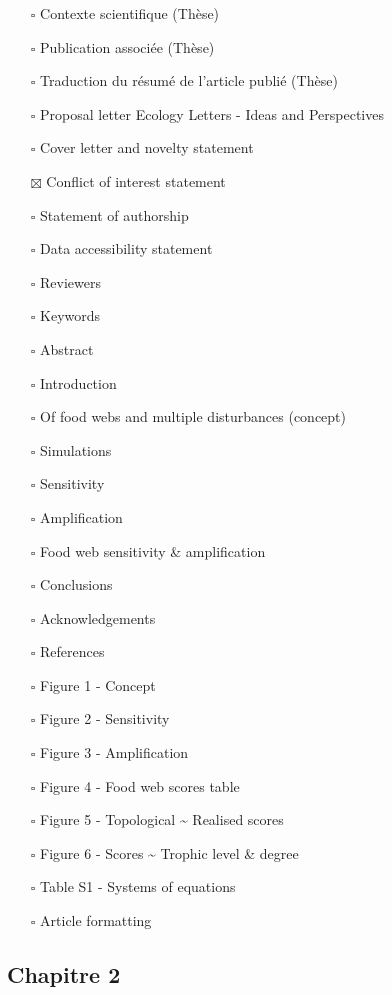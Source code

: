 \begin{itemize}
\tightlist
\item[$\square$]
  Contexte scientifique (Thèse)
\item[$\square$]
  Publication associée (Thèse)
\item[$\square$]
  Traduction du résumé de l'article publié (Thèse)
\item[$\square$]
  Proposal letter Ecology Letters - Ideas and Perspectives
\item[$\square$]
  Cover letter and novelty statement
\item[$\boxtimes$]
  Conflict of interest statement
\item[$\square$]
  Statement of authorship
\item[$\square$]
  Data accessibility statement
\item[$\square$]
  Reviewers
\item[$\square$]
  Keywords
\item[$\square$]
  Abstract
\item[$\square$]
  Introduction
\item[$\square$]
  Of food webs and multiple disturbances (concept)
\item[$\square$]
  Simulations
\item[$\square$]
  Sensitivity
\item[$\square$]
  Amplification
\item[$\square$]
  Food web sensitivity \& amplification
\item[$\square$]
  Conclusions
\item[$\square$]
  Acknowledgements
\item[$\square$]
  References
\item[$\square$]
  Figure 1 - Concept
\item[$\square$]
  Figure 2 - Sensitivity
\item[$\square$]
  Figure 3 - Amplification
\item[$\square$]
  Figure 4 - Food web scores table
\item[$\square$]
  Figure 5 - Topological \textasciitilde{} Realised scores
\item[$\square$]
  Figure 6 - Scores \textasciitilde{} Trophic level \& degree
\item[$\square$]
  Table S1 - Systems of equations
\item[$\square$]
  Article formatting
\end{itemize}

\hypertarget{chapitre-2}{%
\subsection{Chapitre 2}\label{chapitre-2}}

